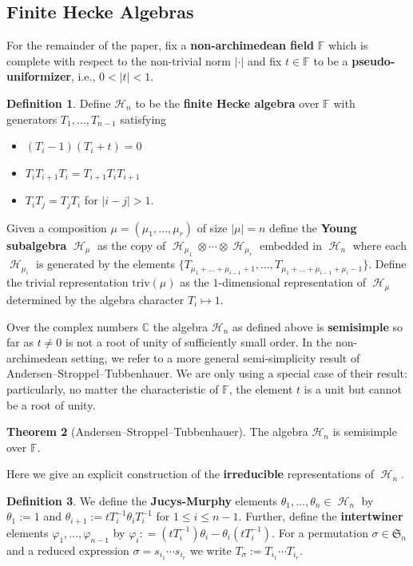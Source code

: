 \documentclass[12pt,reqno]{amsart}
\theoremstyle{definition}
\newtheorem{thm}{Theorem}[section]
\newtheorem{defn}[thm]{Definition}
\DeclareMathOperator{\cH}{\mathcal{H}}
\begin{document}
\subsection{Finite Hecke Algebras}

For the remainder of the paper, fix a \textbf{non-archimedean field} $\mathbb{F}$ which is complete with respect to the non-trivial norm $|\cdot|$ and fix $t \in \mathbb{F}$ to be a \textbf{pseudo-uniformizer}, i.e., $0< |t| < 1.$ 

\begin{defn}\label{defn finite Hecke}
     Define $\mathcal{H}_n$ to be the \textbf{finite Hecke algebra} over $\mathbb{F}$ with generators $T_1,\ldots,T_{n-1}$ satisfying 
    \begin{itemize}
        \item $(T_i-1)(T_i+t) = 0$
        \item $T_iT_{i+1}T_i = T_{i+1}T_iT_{i+1}$
        \item $T_iT_j = T_jT_i$ for $|i - j| > 1.$
    \end{itemize}
    Given a composition $\mu = (\mu_1,\dots,\mu_r)$ of size $|\mu| = n$ define the \textbf{Young subalgebra} $\cH_{\mu}$ as the copy of $\cH_{\mu_1}\otimes \cdots \otimes \cH_{\mu_r}$ embedded in $\cH_{n}$ where each $\cH_{\mu_i}$ is generated by the elements $\{T_{\mu_1+\dots+\mu_{i-1}+1},\dots,T_{\mu_1+\dots+\mu_{i-1}+\mu_i -1}\}.$ Define the trivial representation $\mathrm{triv}(\mu)$ as the $1$-dimensional representation of $\cH_{\mu}$ determined by the algebra character $T_i \mapsto 1.$
\end{defn}

Over the complex numbers $\mathbb{C}$ the algebra $\mathcal{H}_n$ as defined above is \textbf{semisimple} so far as $t \neq 0$ is not a root of unity of sufficiently small order. In the non-archimedean setting, we refer to a more general semi-simplicity result of Andersen--Stroppel--Tubbenhauer. We are only using a special case of their result: particularly, no matter the characteristic of $\mathbb{F}$, the element $t$ is a unit but cannot be a root of unity. 


\begin{thm}[Andersen--Stroppel--Tubbenhauer] \cite{AST17}\label{AST thm}
    The algebra $\mathcal{H}_n$ is semisimple over $\mathbb{F}.$
\end{thm}

Here we give an explicit construction of the \textbf{irreducible} representations of $\cH_n.$

\begin{defn}\label{defn JM elements}
We define the \textbf{Jucys-Murphy} elements $\theta_1,\ldots, \theta_n \in \cH_n$ by $\theta_1 := 1$ and $\theta_{i+1}:= tT_{i}^{-1}\theta_{i}T_{i}^{-1}$ for $1\leq i \leq n-1$. Further, define the \textbf{intertwiner} elements $\varphi_1,\ldots, \varphi_{n-1}$ by $\varphi_i: = (tT_{i}^{-1})\theta_i - \theta_{i}(tT_i^{-1}).$ For a permutation $\sigma \in \mathfrak{S}_n$ and a reduced expression $\sigma = s_{i_1}\cdots s_{i_r}$ we write $T_{\sigma} := T_{i_1}\cdots T_{i_r}.$
\end{defn}
\end{document}
